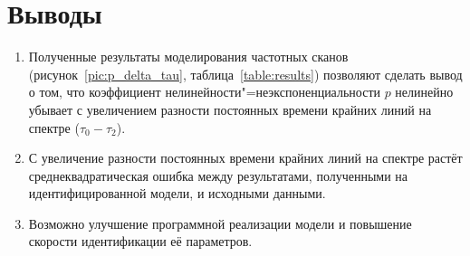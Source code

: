 \section{Выводы}
	\begin{enumerate}
		\item Полученные результаты моделирования частотных сканов 
		(рисунок~\ref{pic:p_delta_tau}, таблица~\ref{table:results})
		позволяют сделать вывод о том, что коэффициент 
		нелинейности"=неэкспоненциальности $p$ нелинейно убывает с 
		увеличением разности постоянных времени крайних линий на спектре
		($\tau_0 - \tau_2$).
		\item С увеличение разности постоянных времени крайних линий на 
		спектре растёт среднеквадратическая ошибка между результатами,
		полученными на идентифицированной модели, и исходными данными.
		\item Возможно улучшение программной реализации модели и повышение
		скорости идентификации её параметров.
	\end{enumerate}